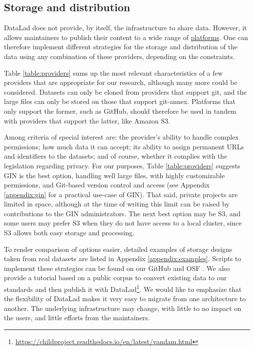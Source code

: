 \documentclass[smallextended]{svjour3}       %
\begin{document}
\subsection{Storage and distribution}\label{section:gin}

DataLad does not provide, by itself, the infrastructure to share data. However, it allows maintainers to publish their content to a wide range of \href{https://git-annex.branchable.com/special_remotes/}{platforms}. One can therefore implement different strategies for the storage and distribution of the data using any combination of these providers, depending on the constraints.

Table \ref{table:providers} sums up the most relevant characteristics of a few providers that are appropriate for our research, although many more could be considered. Datasets can only be cloned from providers that support git, and the large files can only be stored on those that support git-annex. Platforms that only support the former, such as GitHub, should therefore be used in tandem with providers that support the latter, like Amazon S3.

Among criteria of special interest are: the provider's ability to handle complex permissions; how much data it can accept; its ability to assign permanent URLs and identifiers to the datasets; and of course, whether it complies with the legislation regarding privacy. For our purposes, Table \ref{table:providers} suggests GIN is the best option, handling well large files, with highly customizable permissions, and Git-based version control and access (see Appendix \ref{appendix:gin} for a practical use-case of GIN). That said, private projects are limited in space, although at the time of writing this limit can be raised by contributions to the GIN administrators. The next best option may be S3, and some users may prefer S3 when they do not have access to a local cluster, since S3 allows both easy storage and processing. 

To render comparison of options easier, detailed examples of storage designs taken from real datasets are listed in Appendix \ref{appendix:examples}. Scripts to implement these strategies can be found on our GitHub and OSF \citep{datalad_procedures}. We also provide a tutorial based on a public corpus \citep{vandam-day} to convert existing data to our standards and then publish it with DataLad\footnote{\url{https://childproject.readthedocs.io/en/latest/vandam.html}}.
We would like to emphasize that the flexibility of DataLad makes it very easy to migrate from one architecture to another. The underlying infrastructure may change, with little to no impact on the users, and little efforts from the maintainers.
\end{document}
